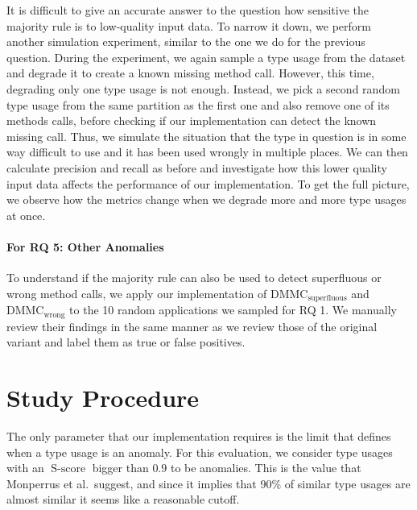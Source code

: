 It is difficult to give an accurate answer to the question how sensitive the majority rule is to low-quality input data.
To narrow it down, we perform another simulation experiment, similar to the one we do for the previous question.
During the experiment, we again sample a type usage from the dataset and degrade it to create a known missing method call.
However, this time, degrading only one type usage is not enough.
Instead, we pick a second random type usage from the same partition as the first one and also remove one of its methods calls, before checking if our implementation can detect the known missing call.
Thus, we simulate the situation that the type in question is in some way difficult to use and it has been used wrongly in multiple places.
We can then calculate precision and recall as before and investigate how this lower quality input data affects the performance of our implementation.
To get the full picture, we observe how the metrics change when we degrade more and more type usages at once.

\paragraph{For RQ 5: Other Anomalies}

To understand if the majority rule can also be used to detect superfluous or wrong method calls, we apply our implementation of $\text{DMMC}_\text{superfluous}$ and $\text{DMMC}_\text{wrong}$ to the 10 random applications we sampled for RQ 1.
We manually review their findings in the same manner as we review those of the original variant and label them as true or false positives.

\section{Study Procedure}

The only parameter that our implementation requires is the limit that defines when a type usage is an anomaly.
For this evaluation, we consider type usages with an $\operatorname{S-score}$ bigger than $0.9$ to be anomalies.
This is the value that Monperrus et al.\ suggest, and since it implies that 90\% of similar type usages are almost similar it seems like a reasonable cutoff.

